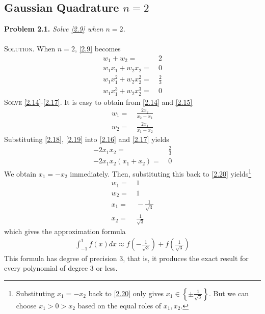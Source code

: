 \documentclass[a4paper]{article}
\numberwithin{equation}{section}
\begin{document}
\subsection{Gaussian Quadrature $n=2$}
\textbf{Problem 2.1.} \textit{Solve \eqref{2.9} when $n=2$.}\\
\\
\textsc{Solution.} When $n=2$, \eqref{2.9} becomes
\begin{align}
\label{2.14}
{w_1} + {w_2} =&\ 2\\
{w_1}{x_1} + {w_2}{x_2} =&\ 0\label{2.15}\\
{w_1}x_1^2 + {w_2}x_2^2 =&\ \frac{2}{3}\label{2.16}\\
{w_1}x_1^3 + {w_2}x_2^3 =&\ 0 \label{2.17}
\end{align}
\textsc{Solve \eqref{2.14}-\eqref{2.17}.} It is easy to obtain from \eqref{2.14} and \eqref{2.15}
\begin{align}
\label{2.18}
{w_1} =&\ \frac{{2{x_2}}}{{{x_2} - {x_1}}}\\
{w_2} =&\ \frac{{2{x_1}}}{{{x_1} - {x_2}}} \label{2.19}
\end{align}
Substituting \eqref{2.18}, \eqref{2.19} into \eqref{2.16} and \eqref{2.17} yields
\begin{align}
\label{2.20}
 - 2{x_1}{x_2}=&\ \frac{2}{3}\\
 - 2{x_1}{x_2}\left( {{x_1} + {x_2}} \right) =&\ 0
\end{align}
We obtain $x_1=-x_2$ immediately. Then, substituting this back to \eqref{2.20} yields\footnote{Substituting $x_1=-x_2$ back to \eqref{2.20} only gives ${x_1} \in \left\{ { \pm \frac{1}{{\sqrt 3 }}} \right\}$. But we can choose $x_1>0>x_2$ based on the equal roles of $x_1,x_2$.}
\begin{align}
{w_1} =&\ 1\\
{w_2} =&\ 1\\
{x_1} =&\  - \frac{1}{{\sqrt 3 }}\\
{x_2} =&\ \frac{1}{{\sqrt 3 }}
\end{align}
which gives the approximation formula
\begin{align}
\int_{ - 1}^1 {f\left( x \right)dx}  \approx f\left( { - \frac{1}{{\sqrt 3 }}} \right) + f\left( {\frac{1}{{\sqrt 3 }}} \right)
\end{align}
This formula has degree of precision 3, that is, it produces the exact result for every polynomial of degree 3 or less.
\end{document}
